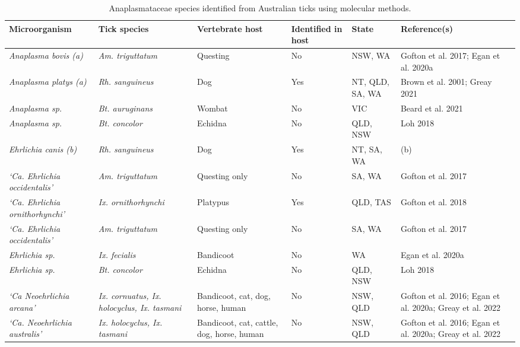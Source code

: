 \documentclass[a4paper, nobind]{templates/ociamthesis}
\begin{document}
\begin{table}

\caption[Anaplasmataceae species identified from Australian ticks.]{\label{tab:T1anaplasm}Anaplasmataceae species identified from Australian ticks using molecular methods.}
\centering
\fontsize{8}{10}\selectfont
\begin{threeparttable}
\begin{tabular}[t]{>{\raggedright\arraybackslash}p{10em}>{\raggedright\arraybackslash}p{10em}>{\raggedright\arraybackslash}p{8em}>{\raggedright\arraybackslash}p{6em}>{\raggedright\arraybackslash}p{6em}>{\raggedright\arraybackslash}p{6em}}
\toprule
Microorganism & Tick species & Vertebrate host & Identified in host & State & Reference(s)\\
\midrule
\em{Anaplasma bovis (a)} & \em{Am. triguttatum} & Questing & No & NSW, WA & Gofton et al. 2017; Egan et al. 2020a\\
\em{Anaplasma platys (a)} & \em{Rh. sanguineus} & Dog & Yes & NT, QLD, SA, WA & Brown et al. 2001; Greay 2021\\
\em{Anaplasma sp.} & \em{Bt. auruginans} & Wombat & No & VIC & Beard et al. 2021\\
\em{Anaplasma sp.} & \em{Bt. concolor} & Echidna & No & QLD, NSW & Loh 2018\\
\em{Ehrlichia canis (b)} & \em{Rh. sanguineus} & Dog & Yes & NT, SA, WA & (b)\\
\em{‘Ca. Ehrlichia occidentalis’} & \em{Am. triguttatum} & Questing only & No & SA, WA & Gofton et al. \vphantom{1} 2017\\
\em{‘Ca. Ehrlichia ornithorhynchi’} & \em{Ix. ornithorhynchi} & Platypus & Yes & QLD, TAS & Gofton et al. 2018\\
\em{‘Ca. Ehrlichia occidentalis’} & \em{Am. triguttatum} & Questing only & No & SA, WA & Gofton et al. 2017\\
\em{Ehrlichia sp.} & \em{Ix. fecialis} & Bandicoot & No & WA & Egan et al. 2020a\\
\em{Ehrlichia sp.} & \em{Bt. concolor} & Echidna & No & QLD, NSW & Loh 2018\\
\em{‘Ca Neoehrlichia arcana’} & \em{Ix. cornuatus, Ix. holocyclus, Ix. tasmani} & Bandicoot, cat, dog, horse, human & No & NSW, QLD & Gofton et al. 2016; Egan et al. 2020a; Greay et al. 2022\\
\em{‘Ca. Neoehrlichia australis’} & \em{Ix. holocyclus, Ix. tasmani} & Bandicoot, cat, cattle, dog, horse, human & No & NSW, QLD & Gofton et al. 2016; Egan et al. 2020a; Greay et al. 2022\\

\end{tabular}
\end{threeparttable}
\end{table}
\end{document}
